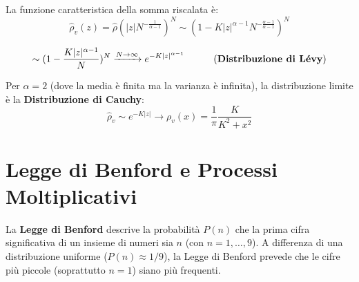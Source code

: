 La funzione caratteristica della somma riscalata è:
\begin{equation}
\hat{\rho}_{v}(z)=\hat{\rho}(|z|N^{-\frac{1}{\alpha-1}})^{N}\sim(1-K|z|^{\alpha-1}N^{-\frac{\alpha-1}{\alpha-1}})^{N}
\end{equation}

\begin{equation}
\sim(1-\frac{K|z|^{\alpha-1}}{N})^{N}\xrightarrow{N\rightarrow\infty} e^{-K|z|^{\alpha-1}} \quad \quad  \quad  \text{(\textbf{Distribuzione di Lévy})}
\end{equation}

Per $\alpha=2$ (dove la media è finita ma la varianza è infinita), la distribuzione limite è la \textbf{Distribuzione di Cauchy}:
\begin{equation}
\hat{\rho}_{v}\sim e^{-K|z|}\rightarrow\rho_{v}(x)=\frac{1}{\pi}\frac{K}{K^{2}+x^{2}}
\end{equation}

\newpage
\section{Legge di Benford e Processi Moltiplicativi}

La \textbf{Legge di Benford} descrive la probabilità $P(n)$ che la prima cifra significativa di un insieme di numeri sia $n$ (con $n=1, \dots, 9$). A differenza di una distribuzione uniforme ($P(n) \approx 1/9$), la Legge di Benford prevede che le cifre più piccole (soprattutto $n=1$) siano più frequenti.

